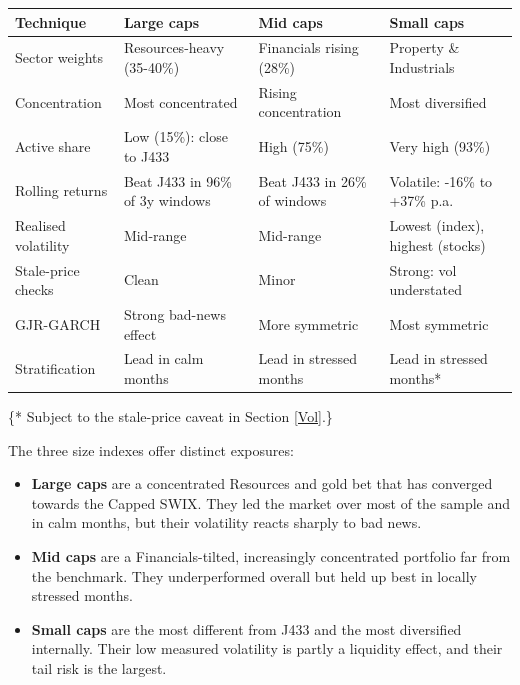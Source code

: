 \documentclass[11pt,preprint]{elsarticle}
\let\origtable\table
\let\endorigtable\endtable
\renewenvironment{table}[1][2] {
    \expandafter\origtable\expandafter[H]
} {
    \endorigtable
}
\numberwithin{equation}{section}
\numberwithin{figure}{section}
\numberwithin{table}{section}
\def\tightlist{} %
\begin{document}
\begin{table}[!htbp]
\centering
\caption{Summary of findings by technique} 
\label{tab:summary}
\begingroup\scriptsize
\begin{tabular}{p{2.6cm}p{3.6cm}p{3.6cm}p{3.6cm}}
  \hline
Technique & Large caps & Mid caps & Small caps \\ 
  \hline
Sector weights & Resources-heavy (35-40\%) & Financials rising (28\%) & Property \& Industrials \\ 
  Concentration & Most concentrated & Rising concentration & Most diversified \\ 
  Active share & Low (15\%): close to J433 & High (75\%) & Very high (93\%) \\ 
  Rolling returns & Beat J433 in 96\% of 3y windows & Beat J433 in 26\% of windows & Volatile: -16\% to +37\% p.a. \\ 
  Realised volatility & Mid-range & Mid-range & Lowest (index), highest (stocks) \\ 
  Stale-price checks & Clean & Minor & Strong: vol understated \\ 
  GJR-GARCH & Strong bad-news effect & More symmetric & Most symmetric \\ 
  Stratification & Lead in calm months & Lead in stressed months & Lead in stressed months* \\ 
   \hline
\end{tabular}
\endgroup
\end{table}

\noindent \footnotesize\{* Subject to the stale-price caveat in Section
\ref{Vol}.\} \normalsize

The three size indexes offer distinct exposures:

\begin{itemize}
\tightlist
\item
  \textbf{Large caps} are a concentrated Resources and gold bet that has
  converged towards the Capped SWIX. They led the market over most of
  the sample and in calm months, but their volatility reacts sharply to
  bad news.
\item
  \textbf{Mid caps} are a Financials-tilted, increasingly concentrated
  portfolio far from the benchmark. They underperformed overall but held
  up best in locally stressed months.
\item
  \textbf{Small caps} are the most different from J433 and the most
  diversified internally. Their low measured volatility is partly a
  liquidity effect, and their tail risk is the largest.
\end{itemize}
\end{document}
